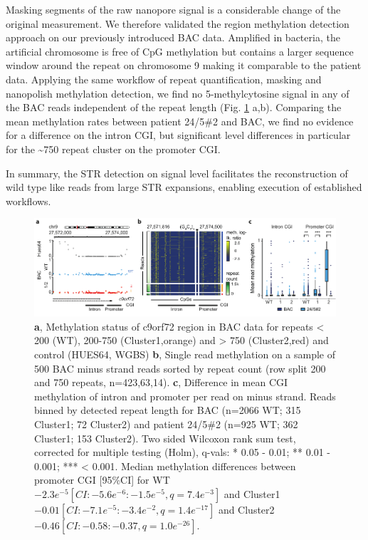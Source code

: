 Masking segments of the raw nanopore signal is a considerable change of the original measurement. We therefore validated the region methylation detection approach on our previously introduced BAC data. Amplified in bacteria, the artificial chromosome is free of CpG methylation but contains a larger sequence window around the repeat on chromosome 9 making it comparable to the patient data. Applying the same workflow of repeat quantification, masking and nanopolish methylation detection, we find no 5-methylcytosine signal in any of the BAC reads independent of the repeat length (Fig. \ref{fig:strique:methylation_bac_region} a,b). Comparing the mean methylation rates between patient 24/5\#2 and BAC, we find no evidence for a difference on the intron CGI, but significant level differences in particular for the \textasciitilde750 repeat cluster on the promoter CGI.

In summary, the STR detection on signal level facilitates the reconstruction of wild type like reads from large STR expansions, enabling execution of established workflows.

\begin{figure}[h]
    \centering
    \includegraphics[width=1.0\textwidth]{figures/strique/methylation_bac_region.pdf}
    \captionsetup{format=plain}
    \caption[Nanopore single read methylation in BAC data]{\textbf{a}, Methylation status of c9orf72 region in BAC data for repeats < 200 (WT), 200-750 (Cluster1,orange) and > 750 (Cluster2,red) and control (HUES64, WGBS) \textbf{b}, Single read methylation on a sample of 500 BAC minus strand reads sorted by repeat count (row split 200 and 750 repeats, n=423,63,14). \textbf{c}, Difference in mean CGI methylation of intron and promoter per read on minus strand. Reads binned by detected repeat length for BAC (n=2066 WT; 315 Cluster1; 72 Cluster2) and patient 24/5\#2 (n=925 WT; 362 Cluster1; 153 Cluster2). Two sided Wilcoxon rank sum test, corrected for multiple testing (Holm), q-vals: * 0.05 - 0.01; ** 0.01 - 0.001; *** < 0.001. Median methylation differences between promoter CGI [95\%CI] for WT $-2.3e^{-5} [CI: -5.6e^{-6}:-1.5e^{-5}, q=7.4e^{-3}] $ and Cluster1 $ -0.01 [CI: -7.1e^{-5}:-3.4e^{-2}, q=1.4e^{-17}] $ and Cluster2 $ -0.46 [CI: -0.58:-0.37, q=1.0e^{-26}] $.}
    \label{fig:strique:methylation_bac_region}
\end{figure}




